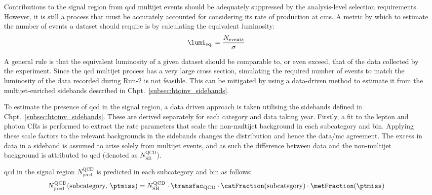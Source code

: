 Contributions to the signal region from \acrshort{qcd} multijet events should be adequately suppressed by the analysis-level selection requirements. However, it is still a process that must be accurately accounted for considering its rate of production at \acrshort{cms}. A metric by which to estimate the number of events a dataset should require is by calculating the equivalent luminosity:
\begin{equation}
    \lumi_{\mathrm{eq.}} = \frac{N_{\mathrm{events}}}{\sigma}
    \label{eq:equivalent_lumi}
\end{equation}

A general rule is that the equivalent luminosity of a given dataset should be comparable to, or even exceed, that of the data collected by the experiment. Since the \acrshort{qcd} multijet process has a very large cross section, simulating the required number of events to match the luminosity of the data recorded during Run-2 is not feasible. This can be mitigated by using a data-driven method to estimate it from the multijet-enriched sidebands described in Chpt.~\ref{subsec:htoinv_sidebands}.

To estimate the presence of \acrshort{qcd} in the signal region, a data driven approach is taken utilising the sidebands defined in Chpt.~\ref{subsec:htoinv_sidebands}. These are derived separately for each category and data taking year. Firstly, a fit to the lepton and photon \glspl{CR} is performed to extract the rate parameters that scale the non-multijet background in each subcategory and \ptmiss bin. Applying these scale factors to the relevant backgrounds in the sidebands changes the distribution and hence the data/\acrshort{mc} agreement. The excess in data in a sideband is assumed to arise solely from multijet events, and as such the difference between data and the non-multijet background is attributed to \acrshort{qcd} (denoted as $N_{\mathrm{SB}}^{\mathrm{QCD}}$).

\acrshort{qcd} in the signal region $N_{\mathrm{pred.}}^{\mathrm{QCD}}$ is predicted in each subcategory and \ptmiss bin as follows: 
\begin{equation}
    N_{\mathrm{pred.}}^{\mathrm{QCD}}(\mathrm{subcategory}, \, \ptmiss) = N_{\mathrm{SB}}^{\mathrm{QCD}} \cdot \transfac_{\mathrm{QCD}} \cdot \catFraction(\mathrm{subcategory}) \cdot \metFraction(\ptmiss)
    \label{eq:qcd_prediction}
\end{equation}

